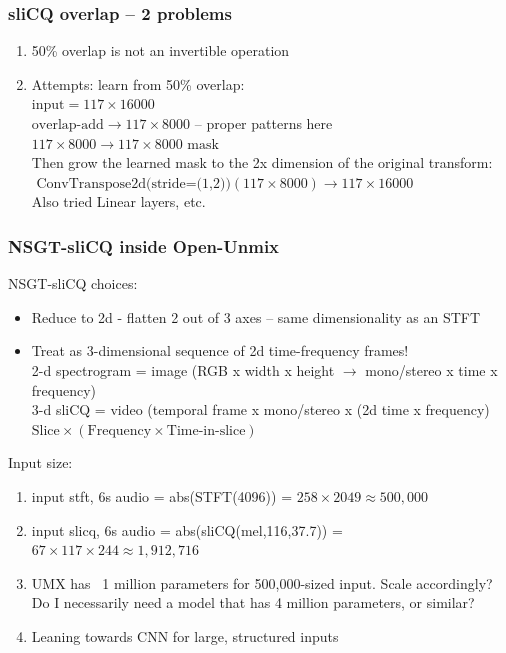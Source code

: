 \documentclass[usenames,dvipsnames]{beamer}
\begin{document}
\begin{frame}
	\frametitle{sliCQ overlap -- 2 problems}
	\begin{enumerate}
		\item
			50\% overlap is not an invertible operation
		\item
			Attempts: learn from 50\% overlap:\\
			$\text{input} = 117 \times 16000$\\
			$\text{overlap-add} \rightarrow 117 \times 8000$ -- proper patterns here
			$117 \times 8000 \rightarrow 117 \times 8000 \text{ mask}$\\
			Then grow the learned mask to the 2x dimension of the original transform:\\
			$\text{ ConvTranspose2d(stride=(1,2))}(117 \times 8000) \rightarrow 117 \times 16000$\\
			Also tried Linear layers, etc.
	\end{enumerate}
\end{frame}

\begin{frame}
	\frametitle{NSGT-sliCQ inside Open-Unmix}
	NSGT-sliCQ choices:
	\begin{itemize}
		\item
			Reduce to 2d - flatten 2 out of 3 axes -- same dimensionality as an STFT
		\item
			Treat as 3-dimensional sequence of 2d time-frequency frames!\\
			2-d spectrogram = image (RGB x width x height $\rightarrow$ mono/stereo x time x frequency)\\
			3-d sliCQ = video (temporal frame x mono/stereo x (2d time x frequency)\\
			$\text{Slice} \times (\text{Frequency} \times \text{Time-in-slice})$
	\end{itemize}
	Input size:
	\begin{enumerate}
		\item
			input stft, 6s audio = abs(STFT(4096)) = $258 \times 2049 \approx 500,000$
		\item
			input slicq, 6s audio = abs(sliCQ(mel,116,37.7)) = $67 \times 117 \times 244 \approx 1,912,716$
		\item
			UMX has ~1 million parameters for 500,000-sized input. Scale accordingly? Do I necessarily need a model that has 4 million parameters, or similar?
		\item
			Leaning towards CNN for large, structured inputs
	\end{enumerate}
\end{frame}
\end{document}
